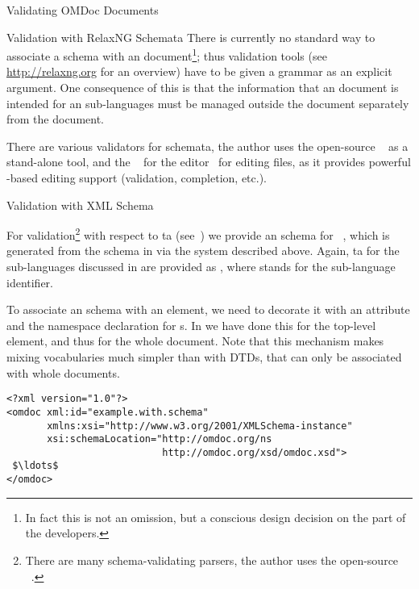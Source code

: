 \begin{tchapter}[id=validating]{Validating OMDoc Documents}
\begin{tsection}[id=validate-rnc]{Validation with RelaxNG Schemata}
  There is currently no standard way to associate a {\relaxng} schema with an {\xml}
  document\footnote{In fact this is not an omission, but a conscious design decision on
    the part of the {\relaxng} developers.}; thus validation tools (see
  \url{http://relaxng.org} for an overview) have to be given a grammar as an explicit
  argument. One consequence of this is that the information that an {\omdoc} document is
  intended for an {\omdoc} sub-languages must be managed outside the document separately
  from the document.

  There are various validators for {\relaxng} schemata, the author uses the open-source
  {}~\cite{Veillard:libxml2} as a stand-alone tool, and the
  {}~\cite{nxml-mode:URL} for the {\emacs} editor~\cite{Stallman:em02}
  for editing {\xml} files, as it provides powerful {\relaxng}-based editing support
  (validation, completion, etc.).
\end{tsection}

\begin{tsection}[id=xsd:validation]{Validation with XML Schema}
  
  For validation\footnote{There are many schema-validating {\xml}
    parsers, the author uses the open-source
    {}~\cite{Veillard:libxml2}.} with respect to {\xml}
  {ta} (see~\cite{XML:Schema}) we provide an {\xml} schema for
  {\omdoc}~\cite{OMDocXSD:URL}, which is generated from the {\relaxng} schema in
  {} via the {} system described above. Again,
  {ta} for the sub-languages discussed in {} are
  provided as {}, where {}
  stands for the sub-language identifier.

  To associate an {\xml} schema with an element, we need to decorate it with an
  {} attribute and the namespace declaration
  for {\xml} {s}. In {} we have done this
  for the top-level {} element, and thus for the whole document. Note that
  this mechanism makes mixing {\xml} vocabularies much simpler than with DTDs, that can
  only be associated with whole documents.

\begin{lstlisting}[label=lst:xml-schema,mathescape,
  caption={An \protect{\xml} document with an {\xml} Schema.},
  index={omdoc,xmlns,xsi,schemaLocation}]
<?xml version="1.0"?>
<omdoc xml:id="example.with.schema"
       xmlns:xsi="http://www.w3.org/2001/XMLSchema-instance" 
       xsi:schemaLocation="http://omdoc.org/ns
                           http://omdoc.org/xsd/omdoc.xsd">
 $\ldots$
</omdoc>
\end{lstlisting}
\end{tsection}

\end{tchapter}

